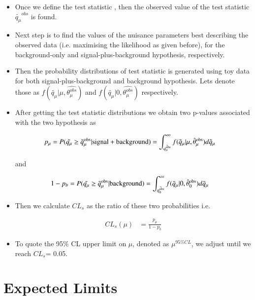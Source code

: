 \begin{itemize}
\item Once we define the test statistic , then the observed value of the test statistic $\tilde{q_{\mu}}^{obs}$ is found. 


\item Next step is to find the values  of  the  nuisance  parameters best  describing  the observed data (i.e.  maximising the likelihood as given before), for the background-only and signal-plus-background hypothesis, respectively.


\item Then the probability distributions of test statistic is generated using toy data for both signal-plus-background  and background  hypothesis. Lets denote those as $f(\tilde{q_{\mu}} | \mu, \hat{\theta_{\mu}^{obs}})$ and $f(\tilde{q_{\mu}} | 0, \hat{\theta_{\mu}^{obs}})$ respectively.

 
\item After getting the test statistic distributions we obtain two p-values associated with the two hypothesis as 

\begin{align}
p_{\mu} & = P(\tilde{q_{\mu}} \geq \tilde{q}_{\mu}^{\rm obs} | {\rm signal+background}) = \int_{\tilde{q_{\mu}^{\rm obs}}}^{\infty} f(\tilde{q}_{\mu} | \mu, \hat{\theta}_{\mu}^{\rm obs}) d\tilde{q}_{\mu}
\label{eq:pvaluesplusb}
\end{align}

and 

\begin{align}
1 - p_{b} & = P(\tilde{q_{\mu}} \geq \tilde{q}_{\mu}^{\rm obs} | {\rm background}) = \int_{\tilde{q_{0}^{\rm obs}}}^{\infty} f(\tilde{q}_{\mu} | 0, \hat{\theta}_{0}^{\rm obs}) d\tilde{q}_{\mu}
\label{eq:pvalueb}
\end{align}

\item Then we calculate $CL_{s}$ as the ratio of these two probabilities i.e. 

\begin{align}
CL_{s}(\mu) & = \frac{p_{\mu}}{1 - p_{b}}
\label{eq:CLs}
\end{align}

\item To quote the 95\%  CL  upper  limit  on $\mu$,  denoted  as $\mu^{95\%CL}$, we adjust until we reach $CL_{s}$= 0.05.

\end{itemize}


\section{Expected Limits }

